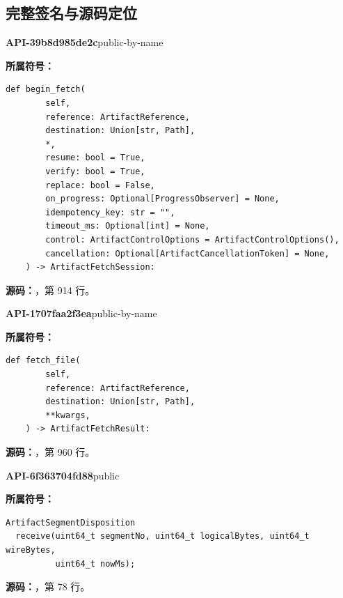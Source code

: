 \subsection{完整签名与源码定位}

\textbf{API-39b8d985de2c}\quad public-by-name\par
\textbf{所属符号：}\par
\begin{Verbatim}[fontsize=\footnotesize,breaklines,breakanywhere]
def begin_fetch(
        self,
        reference: ArtifactReference,
        destination: Union[str, Path],
        *,
        resume: bool = True,
        verify: bool = True,
        replace: bool = False,
        on_progress: Optional[ProgressObserver] = None,
        idempotency_key: str = "",
        timeout_ms: Optional[int] = None,
        control: ArtifactControlOptions = ArtifactControlOptions(),
        cancellation: Optional[ArtifactCancellationToken] = None,
    ) -> ArtifactFetchSession:
\end{Verbatim}
\textbf{源码：}，第 914 行。\par

\textbf{API-1707faa2f3ea}\quad public-by-name\par
\textbf{所属符号：}\par
\begin{Verbatim}[fontsize=\footnotesize,breaklines,breakanywhere]
def fetch_file(
        self,
        reference: ArtifactReference,
        destination: Union[str, Path],
        **kwargs,
    ) -> ArtifactFetchResult:
\end{Verbatim}
\textbf{源码：}，第 960 行。\par

\textbf{API-6f363704fd88}\quad public\par
\textbf{所属符号：}\par
\begin{Verbatim}[fontsize=\footnotesize,breaklines,breakanywhere]
ArtifactSegmentDisposition
  receive(uint64_t segmentNo, uint64_t logicalBytes, uint64_t wireBytes,
          uint64_t nowMs);
\end{Verbatim}
\textbf{源码：}，第 78 行。\par

